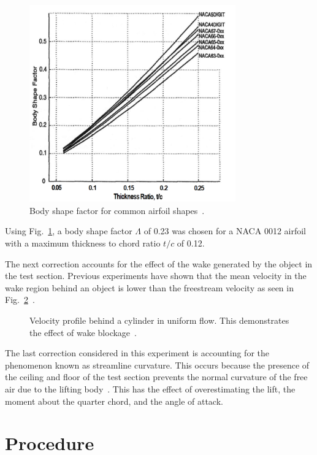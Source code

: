 \documentclass[journal,letterpaper]{IEEEtran}
\begin{document}
\begin{figure}[H]
    \centering
    \includegraphics[width=3.5in]{shapeFactor}
    \caption{Body shape factor for common airfoil shapes~\cite{shape}.}
    \label{fig:shape}
\end{figure}

Using Fig.~\ref{fig:shape}, a body shape factor $\Lambda$ of 0.23 was chosen for a NACA 0012 airfoil with a maximum thickness to chord ratio $t/c$ of 0.12.

The next correction accounts for the effect of the wake generated by the object in the test section.
Previous experiments have shown that the mean velocity in the wake region behind an object is lower than the freestream velocity as seen in Fig.~\ref{fig:profile}~\cite{lab3}.

\begin{figure}[H]
    \centering
    
    \caption{Velocity profile behind a cylinder in uniform flow. This demonstrates the effect of wake blockage~\cite{lab3}.}
    \label{fig:profile}
\end{figure}

The last correction considered in this experiment is accounting for the phenomenon known as streamline curvature.
This occurs because the presence of the ceiling and floor of the test section prevents the normal curvature of the free air due to the lifting body~\cite{lab5r1}.
This has the effect of overestimating the lift, the moment about the quarter chord, and the angle of attack.


\section{Procedure}
\end{document}

